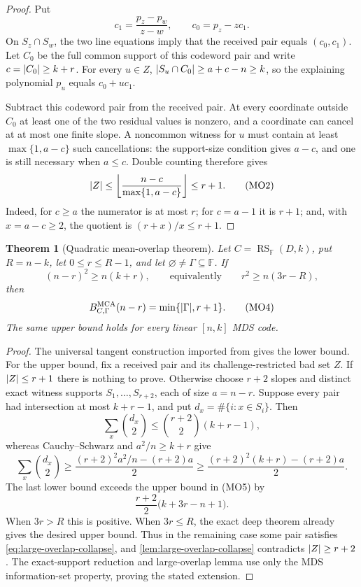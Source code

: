 \documentclass[11pt,a4paper]{amsart}
\numberwithin{equation}{section}
\newtheorem{theorem}{Theorem}[section]
\theoremstyle{remark}
\DeclareMathOperator{\RS}{RS}\DeclareMathOperator{\MCA}{MCA}\DeclareMathOperator{\CA}{CA}
\newcommand{\F}{\mathbb F}\newcommand{\B}{\mathbb B}\newcommand{\K}{\mathbb K}\newcommand{\Z}{\mathbb Z}
\begin{document}
\begin{proof}
Put
\[
 c_1=\frac{p_z-p_w}{z-w},\qquad c_0=p_z-zc_1.
\]
On \(S_z\cap S_w\), the two line equations imply that the received pair
equals \((c_0,c_1)\).  Let \(C_0\) be the full common support of this
codeword pair and write \(c=\lvert C_0\rvert\ge k+r\).  For every \(u\in Z\),
\(\lvert S_u\cap C_0\rvert\ge a+c-n\ge k\), so the explaining polynomial
\(p_u\) equals \(c_0+uc_1\).

Subtract this codeword pair from the received pair.  At every coordinate
outside \(C_0\) at least one of the two residual values is nonzero, and a
coordinate can cancel at at most one finite slope.  A noncommon witness
for \(u\) must contain at least \(\max\{1,a-c\}\) such cancellations:
the support-size condition gives \(a-c\), and one is still necessary when
\(a\le c\).  Double counting therefore gives
\[
 \lvert Z\rvert\le
 \left\lfloor \frac{n-c}{\max\{1,a-c\}}\right\rfloor\le r+1.        \tag{MO2}
\label{eq:large-overlap-count}
\]
Indeed, for \(c\ge a\) the numerator is at most \(r\); for \(c=a-1\)
it is \(r+1\); and, with \(x=a-c\ge2\), the quotient is
\((r+x)/x\le r+1\).
\end{proof}

\begin{theorem}[Quadratic mean-overlap theorem]
\label{thm:quadratic-mean-overlap}
Let \(C=\RS_\F(D,k)\), put \(R=n-k\), let
\(0\le r\le R-1\), and let \(\varnothing\ne\Gamma\subseteq\F\).  If
\[
 (n-r)^2\ge n(k+r),
 \qquad\text{equivalently}\qquad
 r^2\ge n(3r-R),                                  \tag{MO3}
\label{eq:quadratic-overlap-condition}
\]
then
\[
 B_{C,\Gamma}^{\rm MCA}(n-r)=\min\{\lvert \Gamma\rvert,r+1\}. \tag{MO4}
\label{eq:quadratic-overlap-exact}
\]
The same upper bound holds for every linear \([n,k]\) MDS code.
\end{theorem}

\begin{proof}
The universal tangent construction imported from \cite[Sec.~13]{CAP25v132} gives the lower bound.  For the upper
bound, fix a received pair and its challenge-restricted bad set \(Z\).
If \(\lvert Z\rvert\le r+1\) there is nothing to prove.  Otherwise choose
\(r+2\) slopes and distinct exact witness supports
\(S_1,\ldots,S_{r+2}\), each of size \(a=n-r\).  Suppose every pair had
intersection at most \(k+r-1\), and put
\(d_x=\#\{i:x\in S_i\}\).  Then
\[
 \sum_x\binom{d_x}{2}\le\binom{r+2}{2}(k+r-1),    \tag{MO5}
\]
whereas Cauchy--Schwarz and \(a^2/n\ge k+r\) give
\[
 \sum_x\binom{d_x}{2}
 \ge\frac{(r+2)^2a^2/n-(r+2)a}{2}
 \ge\frac{(r+2)^2(k+r)-(r+2)a}{2}.                \tag{MO6}
\]
The last lower bound exceeds the upper bound in \textup{(MO5)} by
\[
 \frac{r+2}{2}\bigl(k+3r-n+1\bigr).
\]
When \(3r>R\) this is positive.  When \(3r\le R\), the exact deep theorem
already gives the desired upper bound.  Thus in the remaining case some
pair satisfies \eqref{eq:large-overlap-collapse}, and
\cref{lem:large-overlap-collapse} contradicts \(\lvert Z\rvert\ge r+2\).
The exact-support reduction and large-overlap lemma use only the MDS
information-set property, proving the stated extension.
\end{proof}
\end{document}
